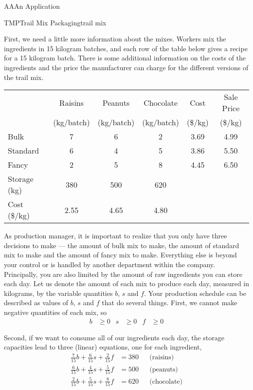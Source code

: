 \begin{subsect}{AA}{An Application}
\begin{example}{TMP}{Trail Mix Packaging}{trail mix}
\begin{para}
%
First, we need a little more information about the mixes.  Workers mix the ingredients in 15 kilogram batches, and each row of the table below gives a recipe for a 15 kilogram batch.  There is some additional information on the costs of the ingredients and the price the manufacturer can charge for the different versions of the trail mix.
%
\begin{center}
\begin{tabular}{l*5{|c}}
&Raisins&Peanuts&Chocolate&Cost&Sale Price\\
&(kg/batch)&(kg/batch)&(kg/batch)&(\$/kg)&(\$/kg)\\\hline\hline
Bulk&7&6&2&3.69&4.99\\\hline
Standard&6&4&5&3.86&5.50\\\hline
Fancy&2&5&8&4.45&6.50\\\hline\hline
Storage (kg)&380&500&620&&\\\hline
Cost (\$/kg)&2.55&4.65&4.80&&
\end{tabular}
\end{center}
\end{para}
%
\begin{para}As production manager, it is important to realize that you only have three decisions to make --- the amount of bulk mix to make, the amount of standard mix to make and the amount of fancy mix to make.  Everything else is beyond your control or is handled by another department within the company.  Principally, you are also limited by the amount of raw ingredients you can store each day.  Let us denote the amount of each mix to produce each day, measured in kilograms, by the variable quantities $b$, $s$ and $f$.  Your production schedule can be described as values of $b$, $s$ and $f$ that do several things.  First, we cannot make negative quantities of each mix, so
%
\begin{align*}
b&\geq 0  &  s&\geq 0  &  f&\geq 0
\end{align*}\end{para}
%
\begin{para}Second, if we want to consume all of our ingredients each day, the storage capacities lead to three (linear) equations, one for each ingredient,
%
\begin{align*}
\frac{7}{15}b+\frac{6}{15}s+\frac{2}{15}f&=380&&\text{(raisins)}\\
\frac{6}{15}b+\frac{4}{15}s+\frac{5}{15}f&=500&&\text{(peanuts)}\\
\frac{2}{15}b+\frac{5}{15}s+\frac{8}{15}f&=620&&\text{(chocolate)}
\end{align*}

\end{para}
\end{example}
\end{subsect}
